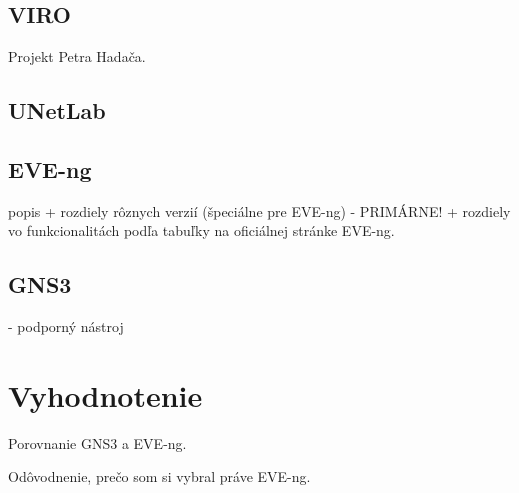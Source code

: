 \subsection{VIRO}

Projekt Petra Hadača.

\subsection{UNetLab}

\subsection{EVE-ng}

popis + rozdiely rôznych verzií (špeciálne pre EVE-ng) - PRIMÁRNE! + rozdiely vo funkcionalitách podľa tabuľky na oficiálnej stránke EVE-ng.

\subsection{GNS3}

- podporný nástroj

\section{Vyhodnotenie}

Porovnanie GNS3 a EVE-ng.

Odôvodnenie, prečo som si vybral práve EVE-ng.